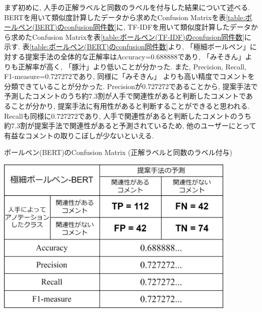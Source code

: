 \documentclass{ltjarticle}
\begin{document}
まず初めに, 人手の正解ラベルと同数のラベルを付与した結果について述べる. 
BERTを用いて類似度計算したデータから求めたConfusion Matrixを表\ref{table:ボールペン(BERT)のconfusion同件数}に, 
TF-IDFを用いて類似度計算したデータから求めたConfusion Matrixを表\ref{table:ボールペン(TF-IDF)のconfusion同件数}に示す. 
表\ref{table:ボールペン(BERT)のconfusion同件数}より, 「極細ボールペン」に対する提案手法の全体的な正解率はAccuracy=0.688888であり, 
「みそきん」よりも正解率が高く, 「豚汁」より低いことが分かった. 
また, Precision, Recall, F1-measure=0.727272であり, 同様に「みそきん」
よりも高い精度でコメントを分類できていることが分かった. Precisionが0.727272であることから, 
提案手法で予測したコメントのうち約7.3割が人手で関連性があると判断したコメントであることが分かり, 提案手法に有用性があると判断することができると思われる. 
Recallも同様に0.727272であり, 人手で関連性があると判断したコメントのうち約7.3割が提案手法で関連性があると予測されているため, 
他のユーザーにとって有益なコメントの取りこぼしが少ないといえる. 
\newpage
\begin{table}[ht]
    \centering
    \caption{ボールペン(BERT)のConfusion Matrix (正解ラベルと同数のラベル付与)}
    \vspace{5truept}

    \includegraphics[width = 11.5cm]{images/ボールペンimages/BERT同件数.drawio.png}
    \label{table:ボールペン(BERT)のconfusion同件数}
\end{table}
\vspace{30truept}
\end{document}
